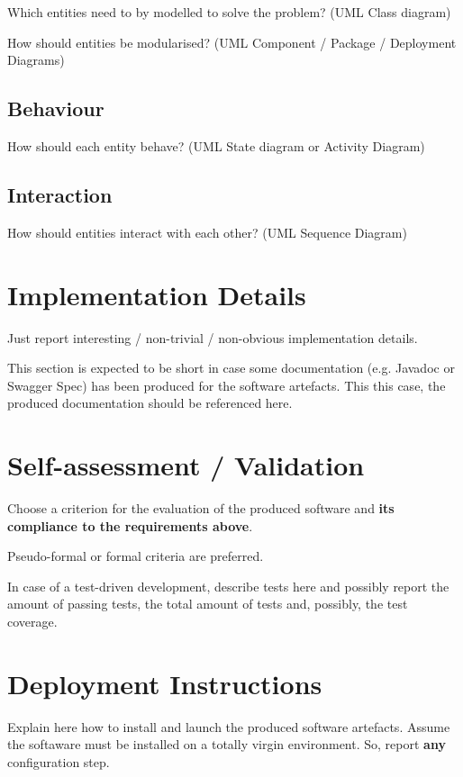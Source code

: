 \documentclass{scrartcl}
\begin{document}
    Which entities need to by modelled to solve the problem?
%
    (UML Class diagram)

    How should entities be modularised?
%
    (UML Component / Package / Deployment Diagrams)

    \subsection{Behaviour}

    How should each entity behave?
%
    (UML State diagram or Activity Diagram)

    \subsection{Interaction}

    How should entities interact with each other?
%
    (UML Sequence Diagram)


    \section{Implementation Details}

    Just report interesting / non-trivial / non-obvious implementation details.

    This section is expected to be short in case some documentation (e.g. Javadoc or Swagger Spec) has been produced for the software artefacts.
%
    This this case, the produced documentation should be referenced here.


    \section{Self-assessment / Validation}

    Choose a criterion for the evaluation of the produced software and \textbf{its compliance to the requirements above}.

    Pseudo-formal or formal criteria are preferred.

    In case of a test-driven development, describe tests here and possibly report the amount of passing tests, the total amount of tests and, possibly, the test coverage.


    \section{Deployment Instructions}

    Explain here how to install and launch the produced software artefacts.
%
    Assume the softaware must be installed on a totally virgin environment.
%
    So, report \textbf{any} configuration step.
\end{document}

